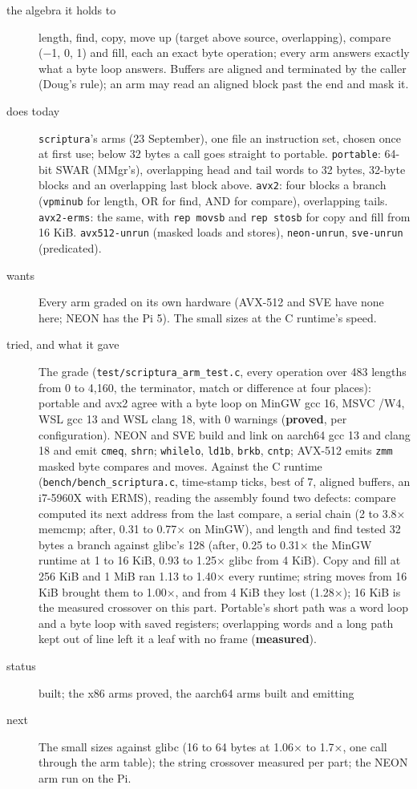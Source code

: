 \begin{description}
\item[{the algebra it holds to}] length, find, copy, move up (target above source, overlapping), compare (−1, 0, 1) and fill, each an exact byte operation; every arm answers exactly what a byte loop answers. Buffers are aligned and terminated by the caller (Doug's rule); an arm may read an aligned block past the end and mask it.
\item[{does today}] \texttt{scriptura}'s arms (23 September), one file an instruction set, chosen once at first use; below 32 bytes a call goes straight to portable. \texttt{portable}: 64-bit SWAR (MMgr's), overlapping head and tail words to 32 bytes, 32-byte blocks and an overlapping last block above. \texttt{avx2}: four blocks a branch (\texttt{vpminub} for length, OR for find, AND for compare), overlapping tails. \texttt{avx2-\allowbreak{}erms}: the same, with \texttt{rep movsb} and \texttt{rep stosb} for copy and fill from 16 KiB. \texttt{avx512-\allowbreak{}unrun} (masked loads and stores), \texttt{neon-\allowbreak{}unrun}, \texttt{sve-\allowbreak{}unrun} (predicated).
\item[{wants}] Every arm graded on its own hardware (AVX-512 and SVE have none here; NEON has the Pi 5). The small sizes at the C runtime's speed.
\item[{tried, and what it gave}] The grade (\texttt{test/\allowbreak{}scriptura\_\allowbreak{}arm\_\allowbreak{}test.\allowbreak{}c}, every operation over 483 lengths from 0 to 4,160, the terminator, match or difference at four places): portable and avx2 agree with a byte loop on MinGW gcc 16, MSVC /W4, WSL gcc 13 and WSL clang 18, with 0 warnings (\textbf{proved}, per configuration). NEON and SVE build and link on aarch64 gcc 13 and clang 18 and emit \texttt{cmeq}, \texttt{shrn}; \texttt{whilelo}, \texttt{ld1b}, \texttt{brkb}, \texttt{cntp}; AVX-512 emits \texttt{zmm} masked byte compares and moves. Against the C runtime (\texttt{bench/\allowbreak{}bench\_\allowbreak{}scriptura.\allowbreak{}c}, time-stamp ticks, best of 7, aligned buffers, an i7-5960X with ERMS), reading the assembly found two defects: compare computed its next address from the last compare, a serial chain (2 to 3.8× memcmp; after, 0.31 to 0.77× on MinGW), and length and find tested 32 bytes a branch against glibc's 128 (after, 0.25 to 0.31× the MinGW runtime at 1 to 16 KiB, 0.93 to 1.25× glibc from 4 KiB). Copy and fill at 256 KiB and 1 MiB ran 1.13 to 1.40× every runtime; string moves from 16 KiB brought them to 1.00×, and from 4 KiB they lost (1.28×); 16 KiB is the measured crossover on this part. Portable's short path was a word loop and a byte loop with saved registers; overlapping words and a long path kept out of line left it a leaf with no frame (\textbf{measured}).
\item[{status}] built; the x86 arms proved, the aarch64 arms built and emitting
\item[{next}] The small sizes against glibc (16 to 64 bytes at 1.06× to 1.7×, one call through the arm table); the string crossover measured per part; the NEON arm run on the Pi.
\end{description}


